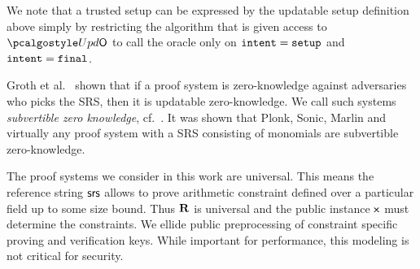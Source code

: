 
 We note that a trusted setup can be expressed by the updatable setup definition above simply by restricting the algorithm that is given access to $\initU$ to call the oracle only on $\mathtt{intent} = \mathtt{setup}$ and $\mathtt{intent} = \mathtt{final}$.

Groth et al.~\cite{C:GKMMM18} shown that if a proof system is zero-knowledge against adversaries who picks the SRS, then it is updatable zero-knowledge. We call such systems \emph{subvertible zero knowledge}, cf.~\cite{AC:BelFucSca16,AC:ABLZ17}. It was shown that Plonk, Sonic, Marlin and virtually any proof system with a SRS consisting of monomials are subvertible zero-knowledge.

 The proof systems we consider in this work are universal. This means the reference string $\mathsf{srs}$ allows to prove arithmetic constraint defined over a particular field up to some size bound. Thus $\mathbf{R}$ is universal and the public instance $\mathsf{x}$ must determine the constraints. We ellide public preprocessing of constraint specific proving and verification keys. While important for performance, this modeling is not critical for security.




